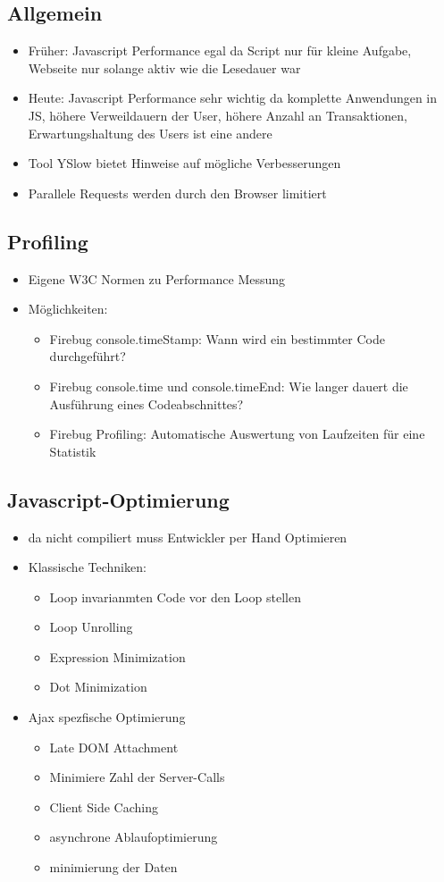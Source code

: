 \documentclass{article} %
\begin{document}
	\subsection{Allgemein}
	\begin{itemize}
		\item Früher: Javascript Performance egal da Script nur für kleine Aufgabe, Webseite nur solange aktiv wie die Lesedauer war
		\item Heute: Javascript Performance sehr wichtig da komplette Anwendungen in JS, höhere Verweildauern der User, höhere Anzahl an Transaktionen, Erwartungshaltung des Users ist eine andere
		\item Tool YSlow bietet Hinweise auf mögliche Verbesserungen
		\item Parallele Requests werden durch den Browser limitiert
	\end{itemize}
	\subsection{Profiling}
	\begin{itemize}
		\item Eigene W3C Normen zu Performance Messung
		\item Möglichkeiten:
		\begin{itemize}
			\item Firebug console.timeStamp: Wann wird ein bestimmter Code durchgeführt?
			\item Firebug console.time und console.timeEnd: Wie langer dauert die Ausführung eines Codeabschnittes?
			\item Firebug Profiling: Automatische Auswertung von Laufzeiten für eine Statistik 
		\end{itemize}
	\end{itemize}
	\subsection{Javascript-Optimierung}
	\begin{itemize}
		\item da nicht compiliert muss Entwickler per Hand Optimieren
		\item Klassische Techniken:
		\begin{itemize}
			\item Loop invarianmten Code vor den Loop stellen
			\item Loop Unrolling
			\item Expression Minimization
			\item Dot Minimization
		\end{itemize}
		\item Ajax spezfische Optimierung
		\begin{itemize}
			\item Late DOM Attachment
			\item Minimiere Zahl der Server-Calls
			\item Client Side Caching
			\item asynchrone Ablaufoptimierung
			\item minimierung der Daten
		\end{itemize}
	\end{itemize}
\end{document}
